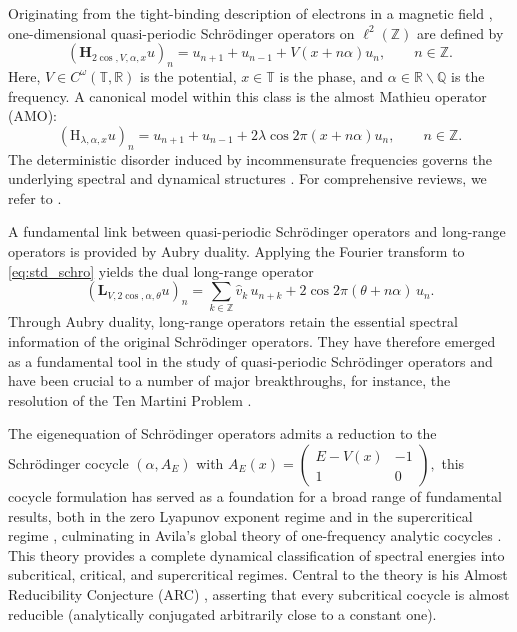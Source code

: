 \documentclass[reqno,11pt]{amsart}
\begin{document}
Originating from the tight-binding description of electrons in a magnetic field \cite{p,harper,R}, one-dimensional quasi-periodic Schr\"odinger operators on $\ell^2(\mathbb Z)$ are defined by
\begin{equation}\label{eq:std_schro}
(\mathbf H_{2\cos,V,\alpha,x}u)_n = u_{n+1}+u_{n-1}+V(x+n\alpha)u_n,\qquad n\in\mathbb Z.
\end{equation}
 Here, $V\in C^\omega(\mathbb T,\mathbb R)$ is the potential, $x\in\mathbb T$ is the phase, and $\alpha\in\mathbb R\backslash\mathbb Q$ is the frequency. A canonical model within this class is the almost Mathieu operator (AMO):
\begin{equation}\label{eq:amo}
(\mathrm H_{\lambda,\alpha,x}u)_n = u_{n+1}+u_{n-1}+2\lambda\cos 2\pi(x+n\alpha)u_n,\qquad n\in\mathbb Z.
\end{equation}
The deterministic disorder induced by incommensurate frequencies governs the underlying spectral and dynamical structures \cite{ALSZ,AJ3,AYZ}. For comprehensive reviews, we refer to \cite{DF,DF2,J,Y}.



A fundamental link between quasi-periodic Schr\"odinger operators and long-range operators is provided by Aubry duality. Applying the Fourier transform to \eqref{eq:std_schro} yields the dual long-range operator
\begin{equation}\label{eq:dual}
(\mathbf L_{V,2\cos ,\alpha,\theta}u)_n=
\sum_{k\in\mathbb Z}\widehat v_k\,u_{n+k}+2\cos 2\pi (\theta+n\alpha)\,u_n.
\end{equation}
Through Aubry duality, long-range operators retain the essential spectral information of the original Schr\"odinger operators. They have therefore emerged as a fundamental tool in the study of quasi-periodic Schr\"odinger operators and have been crucial to a number of major breakthroughs, for instance, the resolution of the Ten Martini Problem \cite{Puig11,AJ3}.


The eigenequation of Schr\"odinger operators admits a reduction to the Schr\"odinger cocycle  $(\alpha,A_E)$ with
$
A_E(x)=
\begin{pmatrix}
E-V(x)&-1\\
1&0
\end{pmatrix},$
this cocycle formulation has served as a foundation for a broad range of fundamental results, both in the zero Lyapunov exponent regime \cite{AJ2,AK,AFK,DS,Eli92} and in the supercritical regime \cite{AJ3,BG00,GS01,GS1,Jit99}, culminating in Avila's global theory of one-frequency analytic cocycles \cite{avila}.  This theory provides a complete dynamical classification of spectral energies into subcritical, critical, and supercritical regimes. Central to the theory is his Almost Reducibility Conjecture (ARC) \cite{avila2010almost,avila-kam}, asserting that every subcritical cocycle is almost reducible (analytically conjugated arbitrarily close to a constant one). 
\end{document}
